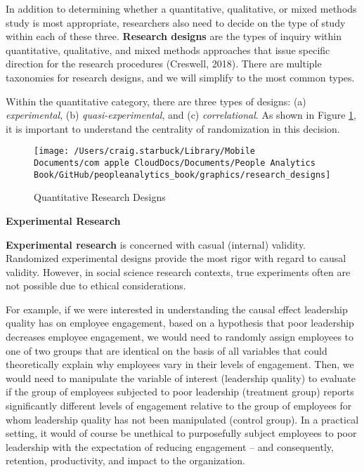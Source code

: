 \documentclass[
]{book}
\begin{document}
In addition to determining whether a quantitative, qualitative, or mixed methods study is most appropriate, researchers also need to decide on the type of study within each of these three. \textbf{Research designs} are the types of inquiry within quantitative, qualitative, and mixed methods approaches that issue specific direction for the research procedures (Creswell, 2018). There are multiple taxonomies for research designs, and we will simplify to the most common types.

Within the quantitative category, there are three types of designs: (a) \emph{experimental}, (b) \emph{quasi-experimental}, and (c) \emph{correlational}. As shown in Figure \ref{fig:res-designs}, it is important to understand the centrality of randomization in this decision.

\begin{figure}

{\centering \texttt{[image: /Users/craig.starbuck/Library/Mobile Documents/com~apple~CloudDocs/Documents/People Analytics Book/GitHub/peopleanalytics\_book/graphics/research\_designs]} 

}

\caption{Quantitative Research Designs}\label{fig:res-designs}
\end{figure}

\textbf{Experimental Research}

\textbf{Experimental research} is concerned with casual (internal) validity. Randomized experimental designs provide the most rigor with regard to causal validity. However, in social science research contexts, true experiments often are not possible due to ethical considerations.

For example, if we were interested in understanding the causal effect leadership quality has on employee engagement, based on a hypothesis that poor leadership decreases employee engagement, we would need to randomly assign employees to one of two groups that are identical on the basis of all variables that could theoretically explain why employees vary in their levels of engagement. Then, we would need to manipulate the variable of interest (leadership quality) to evaluate if the group of employees subjected to poor leadership (treatment group) reports significantly different levels of engagement relative to the group of employees for whom leadership quality has not been manipulated (control group). In a practical setting, it would of course be unethical to purposefully subject employees to poor leadership with the expectation of reducing engagement -- and consequently, retention, productivity, and impact to the organization.
\end{document}
